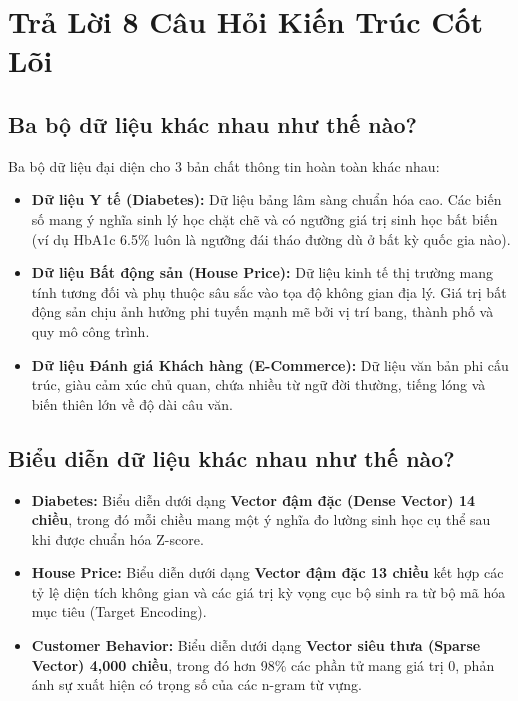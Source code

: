 \documentclass[12pt,a4paper]{report}
\begin{document}
\section{Trả Lời 8 Câu Hỏi Kiến Trúc Cốt Lõi}

\subsection{Ba bộ dữ liệu khác nhau như thế nào?}
Ba bộ dữ liệu đại diện cho 3 bản chất thông tin hoàn toàn khác nhau:
\begin{itemize}[leftmargin=2em]
    \item \textbf{Dữ liệu Y tế (Diabetes):} Dữ liệu bảng lâm sàng chuẩn hóa cao. Các biến số mang ý nghĩa sinh lý học chặt chẽ và có ngưỡng giá trị sinh học bất biến (ví dụ HbA1c 6.5\% luôn là ngưỡng đái tháo đường dù ở bất kỳ quốc gia nào).
    \item \textbf{Dữ liệu Bất động sản (House Price):} Dữ liệu kinh tế thị trường mang tính tương đối và phụ thuộc sâu sắc vào tọa độ không gian địa lý. Giá trị bất động sản chịu ảnh hưởng phi tuyến mạnh mẽ bởi vị trí bang, thành phố và quy mô công trình.
    \item \textbf{Dữ liệu Đánh giá Khách hàng (E-Commerce):} Dữ liệu văn bản phi cấu trúc, giàu cảm xúc chủ quan, chứa nhiều từ ngữ đời thường, tiếng lóng và biến thiên lớn về độ dài câu văn.
\end{itemize}

\subsection{Biểu diễn dữ liệu khác nhau như thế nào?}
\begin{itemize}[leftmargin=2em]
    \item \textbf{Diabetes:} Biểu diễn dưới dạng \textbf{Vector đậm đặc (Dense Vector) 14 chiều}, trong đó mỗi chiều mang một ý nghĩa đo lường sinh học cụ thể sau khi được chuẩn hóa Z-score.
    \item \textbf{House Price:} Biểu diễn dưới dạng \textbf{Vector đậm đặc 13 chiều} kết hợp các tỷ lệ diện tích không gian và các giá trị kỳ vọng cục bộ sinh ra từ bộ mã hóa mục tiêu (Target Encoding).
    \item \textbf{Customer Behavior:} Biểu diễn dưới dạng \textbf{Vector siêu thưa (Sparse Vector) 4,000 chiều}, trong đó hơn 98\% các phần tử mang giá trị 0, phản ánh sự xuất hiện có trọng số của các n-gram từ vựng.
\end{itemize}
\end{document}
